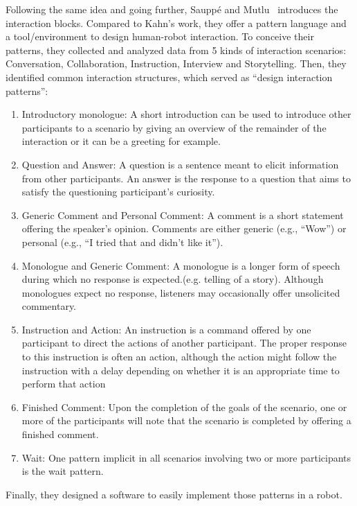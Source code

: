 \documentclass[a4paper,11pt,twoside]{StyleThese}
\begin{document}
Following the same idea and going further, Sauppé and Mutlu~\cite{sauppe_2014_design} introduces the interaction blocks. Compared to Kahn’s work, they offer a pattern language and a tool/environment to design human-robot interaction. To conceive their patterns, they collected and analyzed data from 5 kinds of interaction scenarios: Conversation, Collaboration, Instruction, Interview and Storytelling.
Then, they identified common interaction structures, which served as ``design interaction patterns'':
\begin{enumerate}
	\item Introductory monologue: A short introduction can be used to introduce other participants to a scenario by giving an overview of the remainder of the interaction or it can be a greeting for example.
	\item Question and Answer: A question is a sentence meant to elicit information from other participants. An answer is the response to a question that aims to satisfy the questioning participant’s curiosity.
	\item Generic Comment and Personal Comment: A comment is a short statement offering the speaker’s opinion. Comments are either generic (e.g., ``Wow'') or personal (e.g., ``I tried that and didn’t like it'').
	\item Monologue and Generic Comment: A monologue is a longer form of speech during which no response is expected.(e.g. telling of a story). Although monologues expect no response, listeners may occasionally offer unsolicited commentary.
	\item Instruction and Action: An instruction is a command offered by one participant to direct the actions of another participant. The proper response to this instruction is often an action, although the action might follow the instruction with a delay depending on whether it is an appropriate time to perform that action
	\item Finished Comment: Upon the completion of the goals of the scenario, one or more of the participants will note that the scenario is completed by offering a finished comment.
	\item Wait: One pattern implicit in all scenarios involving two or more participants is the wait pattern.
\end{enumerate}
Finally, they designed a software to easily implement those patterns in a robot.
\end{document}
